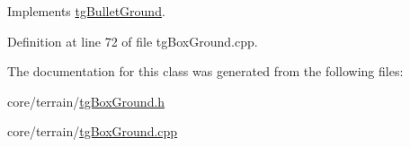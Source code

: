 Implements \hyperlink{classtg_bullet_ground_a9a6ce685977283feae2becf4f705e4cd}{tg\-Bullet\-Ground}.



Definition at line 72 of file tg\-Box\-Ground.\-cpp.



The documentation for this class was generated from the following files\-:\begin{DoxyCompactItemize}
\item 
core/terrain/\hyperlink{tg_box_ground_8h}{tg\-Box\-Ground.\-h}\item 
core/terrain/\hyperlink{tg_box_ground_8cpp}{tg\-Box\-Ground.\-cpp}\end{DoxyCompactItemize}

